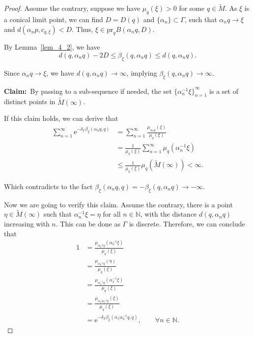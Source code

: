\documentclass[reqno,11pt]{article}
\theoremstyle{definition}
\theoremstyle{remark}
\numberwithin{equation}{section}
\begin{document}
\begin{proof}
	Assume the contrary, suppose we have $\mu_q(\xi)>0$ for some $q\in\widetilde{M}$. As $\xi$ is a conical limit point, we can find $D=D(q)$ and $\{\alpha_n\}\subset\Gamma$, such that $\alpha_n q\to\xi$ and $d(\alpha_n p, c_{q,\xi})<D$. Thus, $\xi\in\text{pr}_q B(\alpha_n q,D)$.

	By Lemma~\ref{lem_4_2}, we have
	\begin{displaymath}
		d(q,\alpha_n q)-2D\leq\beta_{\xi}(q,\alpha_n q)\leq d(q,\alpha_n q).
	\end{displaymath}

	Since $\alpha_n q\to\xi$, we have $d(q,\alpha_n q)\to\infty$, implying $\beta_{\xi}(q,\alpha_n q)\to\infty$.

	\textbf{Claim:}~By passing to a sub-sequence if needed, the set ${\{\alpha_n^{-1}\xi\}}_{n=1}^\infty$ is a set of distinct points in $\widetilde{M}(\infty)$.

	If this claim holds, we can derive that
	\begin{displaymath}
		\begin{aligned}
			\sum_{n=1}^\infty\mathrm{e}^{-\delta_\Gamma\beta_{\xi}(\alpha_n q,q)} & =\sum_{n=1}^\infty \frac{\mu_{\alpha_n q}(\xi)}{\mu_q(\xi)}     \\
			                                                                      & =\frac{1}{\mu_q(\xi)}\sum_{n=1}^\infty\mu_{q}(\alpha_n^{-1}\xi) \\
			                                                                      & \leq\frac{1}{\mu_q(\xi)}\mu_q(\widetilde{M}(\infty))<\infty.
		\end{aligned}
	\end{displaymath}

	Which contradicts to the fact $\beta_\xi(\alpha_n q,q)=-\beta_\xi(q,\alpha_n q)\to -\infty$.

	Now we are going to verify this claim. Assume the contrary, there is a point $\eta\in\widetilde{M}(\infty)$ such that $\alpha_n^{-1}\xi=\eta$ for all $n\in\mathbb{N}$, with the distance $d(q,\alpha_n q)$ increasing with $n$. This can be done as $\Gamma$ is discrete. Therefore, we can conclude that
	\begin{displaymath}
		\begin{aligned}
			1 & =\frac{\mu_{\alpha_n^{-1}q}(\alpha_n^{-1}\xi)}{\mu_q(\xi)}                                       \\
			  & =\frac{\mu_{\alpha_n^{-1}q}(\eta)}{\mu_q(\xi)}                                                   \\
			  & =\frac{\mu_{\alpha_n^{-1}q}(\alpha_1^{-1}\xi)}{\mu_q(\xi)}                                       \\
			  & =\frac{\mu_{\alpha_1\alpha_n^{-1}q}(\xi)}{\mu_q(\xi)}                                            \\
			  & =\mathrm{e}^{-\delta_\Gamma\beta_{\xi}(\alpha_1\alpha_n^{-1}q,q)},\qquad \forall n\in\mathbb{N}.
		\end{aligned}
	\end{displaymath}


\end{proof}
\end{document}
